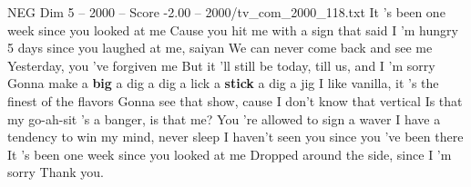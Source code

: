 \begin{textsample}{NEG Dim 5 – 2000 – Score -2.00 – 2000/tv\_com\_2000\_118.txt}  \label{ex:f5_neg_032}
It 's been one week since you looked at me Cause you hit me with a sign that said I 'm hungry 5 days since you laughed at me, saiyan We can never come back and see me Yesterday, you 've forgiven me But it 'll still be today, till us, and I 'm sorry Gonna make a \textbf{big} a dig a dig a lick a \textbf{stick} a dig a jig I like vanilla, it 's the finest of the flavors Gonna see that show, cause I don't know that vertical Is that my go-ah-sit 's a banger, is that me?
You 're allowed to sign a waver I have a tendency to win my mind, never sleep I haven't seen you since you 've been there It 's been one week since you looked at me Dropped around the side, since I 'm sorry Thank you.

\end{textsample}
